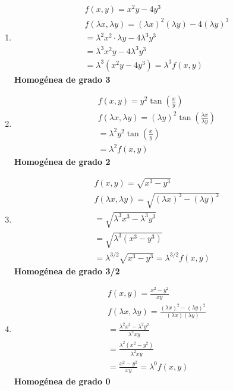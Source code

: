 \documentclass[a4paper,12pt]{article}
\begin{document}
\begin{enumerate}
    \item 
    \[
    \begin{array}{l}
    f(x,y) = x^{2} y - 4y^{3} \\[1.2em]
    f(\lambda x, \lambda y) = (\lambda x)^{2}(\lambda y) - 4(\lambda y)^{3} \\[1.2em]
    = \lambda^{2} x^{2} \cdot \lambda y - 4\lambda^{3} y^{3} \\[1.2em]
    = \lambda^{3} x^{2} y - 4\lambda^{3} y^{3} \\[1.2em]
    = \lambda^{3}(x^{2} y - 4y^{3}) = \lambda^{3} f(x,y)
    \end{array}
    \]
    \textbf{Homogénea de grado 3}

    \item 
    \[
    \begin{array}{l}
    f(x,y) = y^{2}\tan\left(\frac{x}{y}\right) \\[1.2em]
    f(\lambda x, \lambda y) = (\lambda y)^{2}\tan\left(\frac{\lambda x}{\lambda y}\right) \\[1.2em]
    = \lambda^{2} y^{2}\tan\left(\frac{x}{y}\right) \\[1.2em]
    = \lambda^{2} f(x,y)
    \end{array}
    \]
    \textbf{Homogénea de grado 2}

    \item 
    \[
    \begin{array}{l}
    f(x,y) = \sqrt{x^{3} - y^{3}} \\[1.2em]
    f(\lambda x, \lambda y) = \sqrt{(\lambda x)^{3} - (\lambda y)^{3}} \\[1.2em]
    = \sqrt{\lambda^{3} x^{3} - \lambda^{3} y^{3}} \\[1.2em]
    = \sqrt{\lambda^{3}(x^{3} - y^{3})} \\[1.2em]
    = \lambda^{3/2}\sqrt{x^{3} - y^{3}} = \lambda^{3/2} f(x,y)
    \end{array}
    \]
    \textbf{Homogénea de grado 3/2}

    \item 
    \[
    \begin{array}{l}
    f(x,y) = \frac{x^{2} - y^{2}}{xy} \\[1.2em]
    f(\lambda x, \lambda y) = \frac{(\lambda x)^{2} - (\lambda y)^{2}}{(\lambda x)(\lambda y)} \\[1.2em]
    = \frac{\lambda^{2} x^{2} - \lambda^{2} y^{2}}{\lambda^{2} xy} \\[1.2em]
    = \frac{\lambda^{2}(x^{2} - y^{2})}{\lambda^{2} xy} \\[1.2em]
    = \frac{x^{2} - y^{2}}{xy} = \lambda^{0} f(x,y)
    \end{array}
    \]
    \textbf{Homogénea de grado 0}


\end{enumerate}
\end{document}

